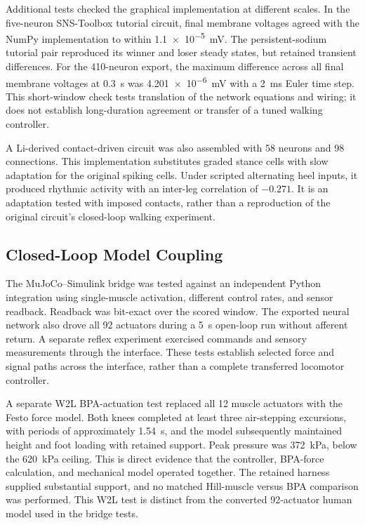 Additional tests checked the graphical implementation at different scales. In the five-neuron SNS-Toolbox tutorial circuit, final membrane voltages agreed with the NumPy implementation to within \qty{1.1e-5}{\milli\volt}. The persistent-sodium tutorial pair reproduced its winner and loser steady states, but retained transient differences. For the 410-neuron export, the maximum difference across all final membrane voltages at \qty{0.3}{\second} was \qty{4.201e-6}{\milli\volt} with a \qty{2}{\milli\second} Euler time step. This short-window check tests translation of the network equations and wiring; it does not establish long-duration agreement or transfer of a tuned walking controller.

A Li-derived contact-driven circuit was also assembled with 58 neurons and 98 connections. This implementation substitutes graded stance cells with slow adaptation for the original spiking cells. Under scripted alternating heel inputs, it produced rhythmic activity with an inter-leg correlation of $-0.271$. It is an adaptation tested with imposed contacts, rather than a reproduction of the original circuit's closed-loop walking experiment.

\subsection{Closed-Loop Model Coupling}

The MuJoCo--Simulink bridge was tested against an independent Python integration using single-muscle activation, different control rates, and sensor readback. Readback was bit-exact over the scored window. The exported neural network also drove all 92 actuators during a \qty{5}{\second} open-loop run without afferent return. A separate reflex experiment exercised commands and sensory measurements through the interface. These tests establish selected force and signal paths across the interface, rather than a complete transferred locomotor controller.

A separate W2L BPA-actuation test replaced all 12 muscle actuators with the Festo force model. Both knees completed at least three air-stepping excursions, with periods of approximately \qty{1.54}{\second}, and the model subsequently maintained height and foot loading with retained support. Peak pressure was \qty{372}{\kPa}, below the \qty{620}{\kPa} ceiling. This is direct evidence that the controller, BPA-force calculation, and mechanical model operated together. The retained harness supplied substantial support, and no matched Hill-muscle versus BPA comparison was performed. This W2L test is distinct from the converted 92-actuator human model used in the bridge tests.

